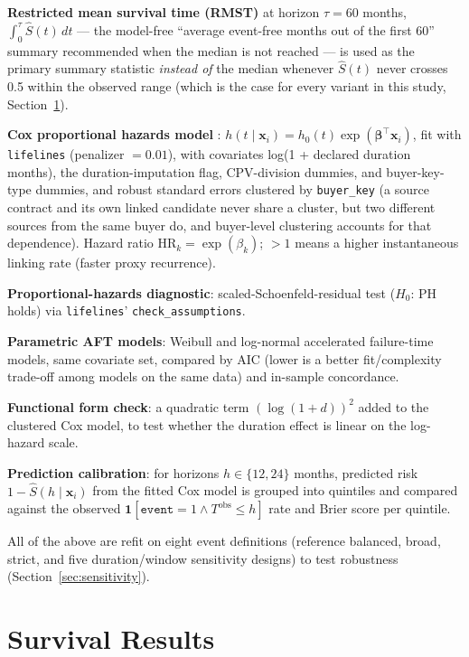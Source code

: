 \documentclass[11pt]{article}
\begin{document}
\textbf{Restricted mean survival time (RMST)} at horizon $\tau=60$ months,
$\int_0^{\tau}\hat S(t)\,dt$ --- the model-free ``average event-free months
out of the first 60'' summary recommended when the median is not reached
\cite{royston2013} --- is used as the primary summary statistic
\emph{instead of} the median whenever $\hat S(t)$ never crosses 0.5 within
the observed range (which is the case for every variant in this study,
Section~\ref{sec:results}).

\textbf{Cox proportional hazards model} \cite{cox1972}: $h(t\mid \mathbf
x_i) = h_0(t) \exp(\boldsymbol\beta^\top \mathbf x_i)$, fit with
\texttt{lifelines} \cite{davidsonpilon2019} (penalizer $=0.01$), with
covariates log(1 + declared duration months),
the duration-imputation flag, CPV-division dummies, and buyer-key-type
dummies, and robust standard errors clustered by \texttt{buyer\_key} (a source contract
and its own linked candidate never share a cluster, but two different
sources from the same buyer do, and buyer-level clustering accounts for
that dependence). Hazard ratio $\mathrm{HR}_k = \exp(\beta_k)$; $>1$ means a
higher instantaneous linking rate (faster proxy recurrence).

\textbf{Proportional-hazards diagnostic}: scaled-Schoenfeld-residual test
($H_0$: PH holds) \cite{grambsch1994} via \texttt{lifelines}'
\texttt{check\_assumptions}.

\textbf{Parametric AFT models}: Weibull and log-normal accelerated
failure-time models, same covariate set, compared by AIC (lower is a better
fit/complexity trade-off among models on the same data) and in-sample
concordance.

\textbf{Functional form check}: a quadratic term
$(\log(1+d))^2$ added to the clustered Cox model, to test whether the
duration effect is linear on the log-hazard scale.

\textbf{Prediction calibration}: for horizons $h\in\{12,24\}$ months,
predicted risk $1-\hat S(h\mid \mathbf x_i)$ from the fitted Cox model is
grouped into quintiles and compared against the observed
$\mathbf 1[\texttt{event}=1 \wedge T^{\text{obs}} \leq h]$ rate and Brier
score \cite{brier1950} per quintile.

All of the above are refit on eight event definitions (reference balanced,
broad, strict, and five duration/window sensitivity designs) to test
robustness (Section~\ref{sec:sensitivity}).

\section{Survival Results}
\label{sec:results}
\end{document}
